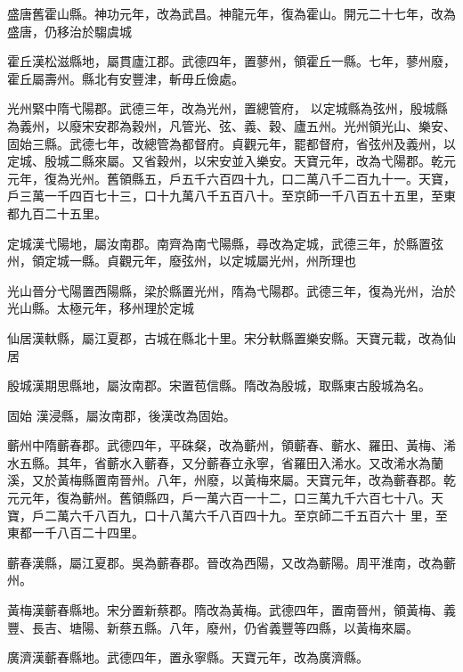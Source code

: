 \begin{pinyinscope}
 盛唐舊霍山縣。神功元年，改為武昌。神龍元年，復為霍山。開元二十七年，改為盛唐，仍移治於騶虞城



 霍丘漢松滋縣地，屬貫廬江郡。武德四年，置蓼州，領霍丘一縣。七年，蓼州廢，霍丘屬壽州。縣北有安豐津，斬毋丘儉處。



 光州緊中隋弋陽郡。武德三年，改為光州，置總管府，
 以定城縣為弦州，殷城縣為義州，以廢宋安郡為穀州，凡管光、弦、義、穀、廬五州。光州領光山、樂安、固始三縣。武德七年，改總管為都督府。貞觀元年，罷都督府，省弦州及義州，以定城、殷城二縣來屬。又省穀州，以宋安並入樂安。天寶元年，改為弋陽郡。乾元元年，復為光州。舊領縣五，戶五千六百四十九，口二萬八千二百九十一。天寶，戶三萬一千四百七十三，口十九萬八千五百八十。至京師一千八百五十五里，至東都九百二十五里。



 定城漢弋陽地，屬汝南郡。南齊為南弋陽縣，尋改為定城，武德三年，於縣置弦州，領定城一縣。貞觀元年，廢弦州，以定城屬光州，州所理也



 光山晉分弋陽置西陽縣，梁於縣置光州，隋為弋陽郡。武德三年，復為光州，治於光山縣。太極元年，移州理於定城



 仙居漢軑縣，屬江夏郡，古城在縣北十里。宋分軑縣置樂安縣。天寶元載，改為仙居



 殷城漢期思縣地，屬汝南郡。宋置苞信縣。隋改為殷城，取縣東古殷城為名。



 固始
 漢浸縣，屬汝南郡，後漢改為固始。



 蘄州中隋蘄春郡。武德四年，平硃粲，改為蘄州，領蘄春、蘄水、羅田、黃梅、浠水五縣。其年，省蘄水入蘄春，又分蘄春立永寧，省羅田入浠水。又改浠水為蘭溪，又於黃梅縣置南晉州。八年，州廢，以黃梅來屬。天寶元年，改為蘄春郡。乾元元年，復為蘄州。舊領縣四，戶一萬六百一十二，口三萬九千六百七十八。天寶，戶二萬六千八百九，口十八萬六千八百四十九。至京師二千五百六十
 里，至東都一千八百二十四里。



 蘄春漢縣，屬江夏郡。吳為蘄春郡。晉改為西陽，又改為蘄陽。周平淮南，改為蘄州。



 黃梅漢蘄春縣地。宋分置新蔡郡。隋改為黃梅。武德四年，置南晉州，領黃梅、義豐、長吉、塘陽、新蔡五縣。八年，廢州，仍省義豐等四縣，以黃梅來屬。



 廣濟漢蘄春縣地。武德四年，置永寧縣。天寶元年，改為廣濟縣。




\end{pinyinscope}
